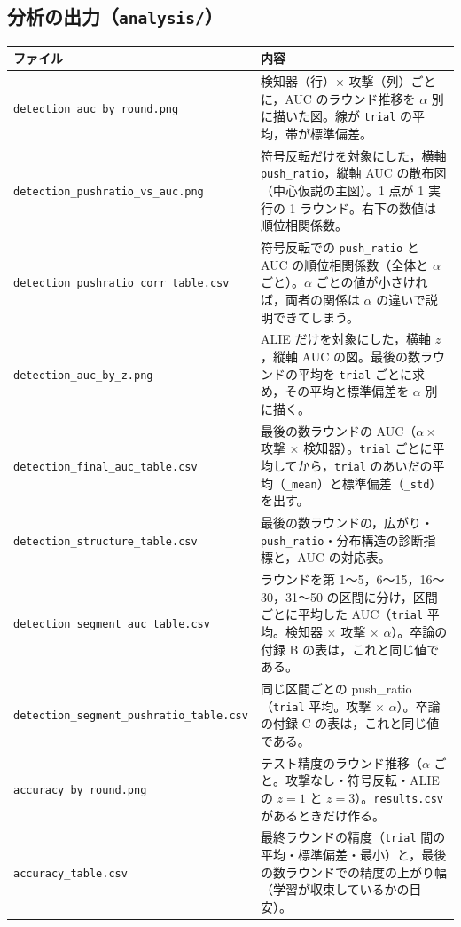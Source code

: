 \documentclass[a4j, dvipdfmx]{jsarticle}  %
\begin{document}
\subsection{分析の出力（\texttt{analysis/}）}

\begin{table}[H]
\centering
\begin{tabular}{@{}P{5.6cm} P{9.7cm}@{}}
\toprule
ファイル & 内容 \\
\midrule
\texttt{detection\_auc\_by\_round.png} & 検知器（行）$\times$ 攻撃（列）ごとに，AUC のラウンド推移を $\alpha$ 別に描いた図。線が \texttt{trial} の平均，帯が標準偏差。 \\
\texttt{detection\_pushratio\_vs\_auc.png} & 符号反転だけを対象にした，横軸 \texttt{push\_ratio}，縦軸 AUC の散布図（中心仮説の主図）。1 点が 1 実行の 1 ラウンド。右下の数値は順位相関係数。 \\
\texttt{detection\_pushratio\_}\allowbreak\texttt{corr\_table.csv} & 符号反転での \texttt{push\_ratio} と AUC の順位相関係数（全体と $\alpha$ ごと）。$\alpha$ ごとの値が小さければ，両者の関係は $\alpha$ の違いで説明できてしまう。 \\
\texttt{detection\_auc\_by\_z.png} & ALIE だけを対象にした，横軸 $z$，縦軸 AUC の図。最後の数ラウンドの平均を \texttt{trial} ごとに求め，その平均と標準偏差を $\alpha$ 別に描く。 \\
\texttt{detection\_final\_auc\_table.csv} & 最後の数ラウンドの AUC（$\alpha \times$ 攻撃 $\times$ 検知器）。\texttt{trial} ごとに平均してから，\texttt{trial} のあいだの平均（\texttt{\_mean}）と標準偏差（\texttt{\_std}）を出す。 \\
\texttt{detection\_structure\_table.csv} & 最後の数ラウンドの，広がり・\texttt{push\_ratio}・分布構造の診断指標と，AUC の対応表。 \\
\texttt{detection\_segment\_auc\_table.csv} & ラウンドを第 1〜5，6〜15，16〜30，31〜50 の区間に分け，区間ごとに平均した AUC（\texttt{trial} 平均。検知器 $\times$ 攻撃 $\times$ $\alpha$）。卒論の付録 B の表は，これと同じ値である。 \\
\texttt{detection\_segment\_}\allowbreak\texttt{pushratio\_table.csv} & 同じ区間ごとの push\_ratio（\texttt{trial} 平均。攻撃 $\times$ $\alpha$）。卒論の付録 C の表は，これと同じ値である。 \\
\texttt{accuracy\_by\_round.png} & テスト精度のラウンド推移（$\alpha$ ごと。攻撃なし・符号反転・ALIE の $z=1$ と $z=3$）。\texttt{results.csv} があるときだけ作る。 \\
\texttt{accuracy\_table.csv} & 最終ラウンドの精度（\texttt{trial} 間の平均・標準偏差・最小）と，最後の数ラウンドでの精度の上がり幅（学習が収束しているかの目安）。 \\
\bottomrule
\end{tabular}
\end{table}
\end{document}
